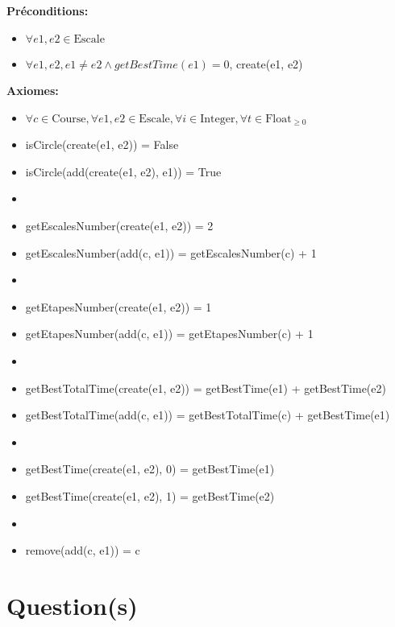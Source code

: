 \documentclass[a4paper, 11pt, oneside]{article}
\begin{document}
\textbf{Préconditions:}
\begin{itemize}
    \item[] $\forall e1, e2 \in \text{Escale}$
    \item[] $\forall e1, e2, e1 \neq e2 \land getBestTime(e1) = 0$, create(e1, e2)
\end{itemize}

\textbf{Axiomes:}
\begin{itemize}
    \item[] $\forall c \in \text{Course}, \forall e1, e2 \in \text{Escale}, \forall i \in \text{Integer}, \forall t \in \text{Float}_{\geq0}$
    \item[] isCircle(create(e1, e2)) = False
    \item[] isCircle(add(create(e1, e2), e1)) = True
    \item[]
    \item[] getEscalesNumber(create(e1, e2)) = 2
    \item[] getEscalesNumber(add(c, e1)) = getEscalesNumber(c) + 1
    \item[]
    \item[] getEtapesNumber(create(e1, e2)) = 1
    \item[] getEtapesNumber(add(c, e1)) = getEtapesNumber(c) + 1
    \item[]
    \item[] getBestTotalTime(create(e1, e2)) = getBestTime(e1) + getBestTime(e2)
    \item[] getBestTotalTime(add(c, e1)) = getBestTotalTime(c) + getBestTime(e1)
    \item[]
    \item[] getBestTime(create(e1, e2), 0) = getBestTime(e1)
    \item[] getBestTime(create(e1, e2), 1) = getBestTime(e2)
    \item[]
    \item[] remove(add(c, e1)) = c
\end{itemize}


\section{Question(s)}

\end{document}
